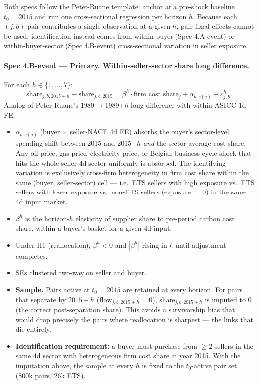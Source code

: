 \documentclass[11pt]{article}
\begin{document}
Both specs follow the Peter-Ruane template: anchor at a pre-shock baseline $t_0=2015$ and run one cross-sectional regression per horizon $h$. Because each $(j,b)$ pair contributes a single observation at a given $h$, pair fixed effects cannot be used; identification instead comes from within-buyer (Spec 4.A-event) or within-buyer-sector (Spec 4.B-event) cross-sectional variation in seller exposure.

\paragraph{Spec 4.B-event --- Primary. Within-seller-sector share long difference.}
For each $h\in\{1,\ldots,7\}$:
\begin{equation}
  \mathrm{share}_{j,b,2015+h} - \mathrm{share}_{j,b,2015}
  = \beta^{h}\cdot \mathrm{firm\_cost\_share}_{j}
  + \alpha_{b, s(j)} + \varepsilon_{j,b}^{h}.
  \label{eq:4B-event}
\end{equation}
Analog of Peter-Ruane's 1989$\to$1989+$h$ long difference with within-ASICC-1d FE.
\begin{itemize}
  \item $\alpha_{b, s(j)}$ (buyer $\times$ seller-NACE 4d FE) absorbs the buyer's sector-level spending shift between 2015 and 2015+$h$ \emph{and} the sector-average cost share. Any oil price, gas price, electricity price, or Belgian business-cycle shock that hits the whole seller-4d sector uniformly is absorbed. The identifying variation is exclusively cross-firm heterogeneity in $\mathrm{firm\_cost\_share}$ within the same (buyer, seller-sector) cell --- i.e.\ ETS sellers with high exposure vs.\ ETS sellers with lower exposure vs.\ non-ETS sellers (exposure $= 0$) in the same 4d input market.
  \item $\beta^h$ is the horizon-$h$ elasticity of supplier share to pre-period carbon cost share, within a buyer's basket for a given 4d input.
  \item Under H1 (reallocation), $\beta^h<0$ and $|\beta^h|$ rising in $h$ until adjustment completes.
  \item SEs clustered two-way on seller and buyer.
  \item \textbf{Sample.} Pairs active at $t_0=2015$ are retained at every horizon. For pairs that separate by $2015+h$ ($\mathrm{flow}_{j,b,2015+h}=0$), $\mathrm{share}_{j,b,2015+h}$ is imputed to $0$ (the correct post-separation share). This avoids a survivorship bias that would drop precisely the pairs where reallocation is sharpest --- the links that die entirely.
  \item \textbf{Identification requirement:} a buyer must purchase from $\geq 2$ sellers in the same 4d sector with heterogeneous $\mathrm{firm\_cost\_share}$ in year 2015. With the imputation above, the sample at every $h$ is fixed to the $t_0$-active pair set (800k pairs, 26k ETS).
\end{itemize}
\end{document}

